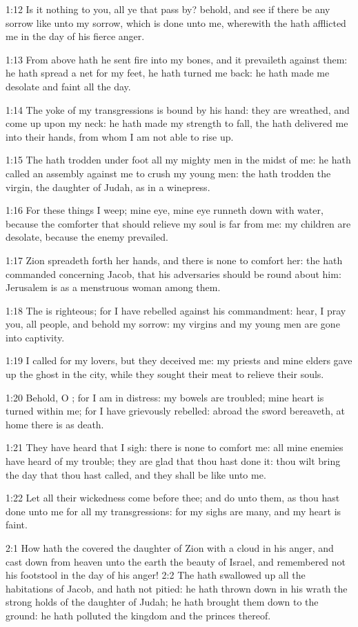 1:12 Is it nothing to you, all ye that pass by? behold, and see if there be any sorrow like unto my sorrow, which is done unto me, wherewith the \LORD hath afflicted me in the day of his fierce anger.

1:13 From above hath he sent fire into my bones, and it prevaileth against them: he hath spread a net for my feet, he hath turned me back: he hath made me desolate and faint all the day.

1:14 The yoke of my transgressions is bound by his hand: they are wreathed, and come up upon my neck: he hath made my strength to fall, the \LORD hath delivered me into their hands, from whom I am not able to rise up.

1:15 The \LORD hath trodden under foot all my mighty men in the midst of me: he hath called an assembly against me to crush my young men: the \LORD hath trodden the virgin, the daughter of Judah, as in a winepress.

1:16 For these things I weep; mine eye, mine eye runneth down with water, because the comforter that should relieve my soul is far from me: my children are desolate, because the enemy prevailed.

1:17 Zion spreadeth forth her hands, and there is none to comfort her: the \LORD hath commanded concerning Jacob, that his adversaries should be round about him: Jerusalem is as a menstruous woman among them.

1:18 The \LORD is righteous; for I have rebelled against his commandment: hear, I pray you, all people, and behold my sorrow: my virgins and my young men are gone into captivity.

1:19 I called for my lovers, but they deceived me: my priests and mine elders gave up the ghost in the city, while they sought their meat to relieve their souls.

1:20 Behold, O \LORD; for I am in distress: my bowels are troubled; mine heart is turned within me; for I have grievously rebelled: abroad the sword bereaveth, at home there is as death.

1:21 They have heard that I sigh: there is none to comfort me: all mine enemies have heard of my trouble; they are glad that thou hast done it: thou wilt bring the day that thou hast called, and they shall be like unto me.

1:22 Let all their wickedness come before thee; and do unto them, as thou hast done unto me for all my transgressions: for my sighs are many, and my heart is faint.

2:1 How hath the \LORD covered the daughter of Zion with a cloud in his anger, and cast down from heaven unto the earth the beauty of Israel, and remembered not his footstool in the day of his anger!  2:2 The \LORD hath swallowed up all the habitations of Jacob, and hath not pitied: he hath thrown down in his wrath the strong holds of the daughter of Judah; he hath brought them down to the ground: he hath polluted the kingdom and the princes thereof.

